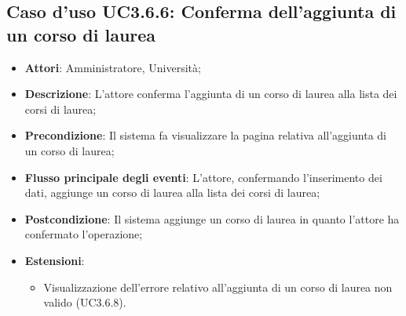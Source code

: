\subsection{Caso d'uso \texorpdfstring{UC3.6.6}{UC3.6.6}: Conferma dell’aggiunta di un corso di laurea}
\begin{itemize}
	\item \textbf{Attori}: Amministratore, Università;
	\item \textbf{Descrizione}: L'attore conferma l'aggiunta di un corso di laurea alla lista dei corsi di laurea;
	
	\item \textbf{Precondizione}: Il sistema fa visualizzare la pagina relativa all'aggiunta di un corso di laurea;
	
	\item \textbf{Flusso principale degli eventi}: L'attore, confermando l'inserimento dei dati, aggiunge un corso di laurea alla lista dei corsi di laurea;
	
	\item \textbf{Postcondizione}: Il sistema aggiunge un corso di laurea in quanto l'attore ha confermato l'operazione;
	
	\item \textbf{Estensioni}:
	\begin{itemize}
		\item Visualizzazione dell'errore relativo all’aggiunta di un corso di laurea non valido (UC3.6.8).
	\end{itemize}
\end{itemize}
